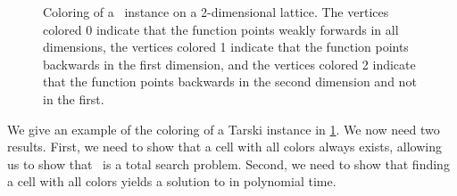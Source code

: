 \begin{figure}[ht]
	\centering
	\caption[Coloring of a \Tarskistar instance]{Coloring of a \Tarskistar\ instance on a 2-dimensional lattice. The vertices colored 0 indicate that the function points weakly forwards in all dimensions, the vertices colored 1 indicate that the function points backwards in the first dimension, and the vertices colored 2 indicate that the function points backwards in the second dimension and not in the first.}
	\label{fig:tarskistar_coloring}
\end{figure}

We give an example of the coloring of a Tarski instance in \cref{fig:tarskistar_coloring}. We now need two results. First, we need to show that a cell with all colors always exists, allowing us to show that \Tarskistar\ is a total search problem. Second, we need to show that finding a cell with all colors yields a solution to \Tarskistar in polynomial time.

